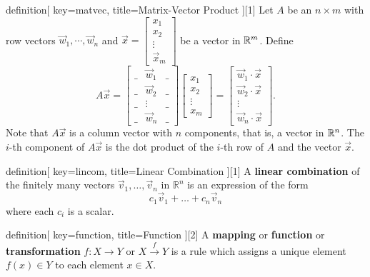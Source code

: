 \begin{SaveConcept}{definition}[
		key=matvec,
		title={Matrix-Vector Product}
	][1]
        Let $A$ be an $n\times m$ with row vectors $\vec w_1,\cdots,\vec w_n$ and $\vec x=\begin{bmatrix} x_1\\x_2\\\vdots\\\vec x_m \end{bmatrix}$ be a vector in $\mathbb{R}^m$. Define 
	$$
	A\vec x=\begin{bmatrix}
		\_&\vec w_1&\_\\
		\_&\vec w_2&\_\\
		\_&\vdots&\_\\
		\_&\vec w_n&\_
	\end{bmatrix}\begin{bmatrix}
		x_1\\x_2\\\vdots\\ x_m
	\end{bmatrix}=\begin{bmatrix}
		\vec w_1\cdot \vec x\\\vec w_2\cdot \vec x\\\vdots\\\vec w_n\cdot\vec x
	\end{bmatrix}.
	$$
	Note that $A\vec x$ is a column vector with $n$ components, that is, a vector in $\mathbb{R}^n$. The $i$-th component of $A\vec x$ is the dot product of the $i$-th row of $A$ and the vector $\vec x$.
\end{SaveConcept}


\begin{SaveConcept}{definition}[
		key=lincom,
		title={Linear Combination}
	][1]
        A {\bf linear combination} of the finitely many vectors $\vec v_1, \dots, \vec v_n$ in $\mathbb R^n$ is an expression of the form 
	$$
	c_1 \vec v_1 + \dots + c_n \vec v_n
	$$
	where each $c_i$ is a scalar. 
\end{SaveConcept}


\begin{SaveConcept}{definition}[
		key=function,
		title={Function}
	][2]
	A {\bf mapping} or {\bf function} or {\bf transformation} $f:X \longrightarrow Y$ or $X \overset{f}\rightarrow Y$ is a rule which assigns a unique element $f(x)\in Y$ to each element $x \in X$.
\end{SaveConcept}


